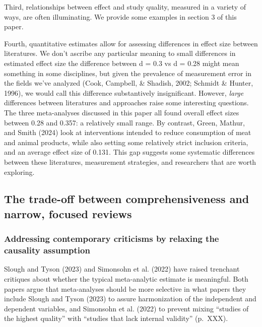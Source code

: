 \documentclass[
  ,jou]{apa6}
\begin{document}
Third, relationships between effect and study quality, measured in a variety of ways, are often illuminating. We provide some examples in section 3 of this paper.

Fourth, quantitative estimates allow for assessing differences in effect size between literatures. We don't ascribe any particular meaning to small differences in estimated effect size \textemdash the difference between d = 0.3 vs d = 0.28 might mean something in some disciplines, but given the prevalence of measurement error in the fields we've analyzed (Cook, Campbell, \& Shadish, 2002; Schmidt \& Hunter, 1996), we would call this difference substantively insignificant. However, \emph{large} differences between literatures and approaches raise some interesting questions. The three meta-analyses discussed in this paper all found overall effect sizes between 0.28 and 0.357: a relatively small range. By contrast, Green, Mathur, and Smith (2024) look at interventions intended to reduce consumption of meat and animal products, while also setting some relatively strict inclusion criteria, and an average effect size of 0.131. This gap suggests some systematic differences between these literatures, measurement strategies, and researchers that are worth exploring.

\subsection{The trade-off between comprehensiveness and narrow, focused reviews}\label{the-trade-off-between-comprehensiveness-and-narrow-focused-reviews}

\subsubsection{Addressing contemporary criticisms by relaxing the causality assumption}\label{addressing-contemporary-criticisms-by-relaxing-the-causality-assumption}

Slough and Tyson (2023) and Simonsohn et al. (2022) have raised trenchant critiques about whether the typical meta-analytic estimate is meaningful. Both papers argue that meta-analyses should be more selective in what papers they include \textemdash Slough and Tyson (2023) to assure harmonization of the independent and dependent variables, and Simonsohn et al. (2022) to prevent mixing ``studies of the highest quality'' with ``studies that lack internal validity'' (p.~XXX).
\end{document}
